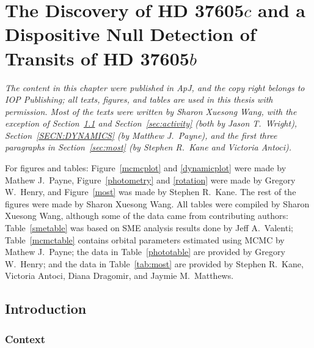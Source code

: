 \chapter{The Discovery of HD 37605\lowercase{$c$} and a Dispositive
Null Detection of Transits of HD
37605\lowercase{$b$}}\label{chap:planets}

{\it
  The content in this chapter were published in ApJ, and the copy
  right belongs to IOP Publishing; all texts, figures, and tables are
  used in this thesis with permission. Most of the texts were written
  by Sharon Xuesong Wang, with the exception of
  Section~\ref{sec:intro} and Section~\ref{sec:activity} (both by
  Jason T.\ Wright), Section~\ref{SECN:DYNAMICS} (by Matthew
  J.\ Payne), and the first three paragraphs in Section~\ref{sec:most}
  (by Stephen R.\ Kane and Victoria Antoci).

  For figures and tables: Figure~\ref{mcmcplot} and \ref{dynamicplot}
  were made by Mathew J.\ Payne, Figure~\ref{photometry} and
  \ref{rotation} were made by Gregory W.\ Henry, and Figure~\ref{most}
  was made by Stephen R.\ Kane. The rest of the figures were made by
  Sharon Xuesong Wang. All tables were compiled by Sharon Xuesong
  Wang, although some of the data came from contributing authors:
  Table~\ref{smetable} was based on SME analysis results done by Jeff
  A.\ Valenti; Table~\ref{mcmctable} contains orbital parameters
  estimated using MCMC by Mathew J.\ Payne; the data in
  Table~\ref{phototable} are provided by Gregory W.\ Henry; and the
  data in Table~\ref{tab:most} are provided by Stephen R.\ Kane,
  Victoria Antoci, Diana Dragomir, and Jaymie M.\ Matthews.

}

\section{Introduction}\label{sec:intro}

\subsection{Context}

